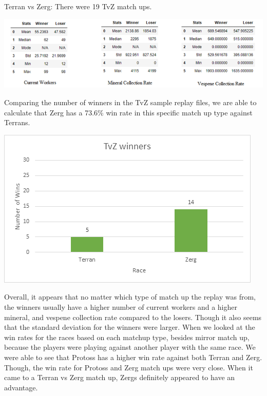 \documentclass[a4paper,12pt]{report}
\begin{document}
Terran vs Zerg:
There were 19 TvZ match ups.

\begin{center}
    \captionsetup{type=figure}
    \includegraphics[width=.9\linewidth]{media/WorkersCollectionTvZ.png}
\end{center}

Comparing the number of winners in the TvZ sample replay files, we are able to calculate that Zerg has a 73.6\% win rate in this specific match up type against Terrans.

\begin{center}
    \captionsetup{type=figure}
    \includegraphics[width=.9\linewidth]{media/TvZwinrate.png}
\end{center}

Overall, it appears that no matter which type of match up the replay was from, the winners usually have a higher number of current workers and a higher mineral, and vespene collection rate compared to the losers. Though it also seems that the standard deviation for the winners were larger. When we looked at the win rates for the races based on each matchup type, besides mirror match up, because the players were playing against another player with the same race. We were able to see that Protoss has a higher win rate against both Terran and Zerg. Though, the win rate for Protoss and Zerg match ups were very close. When it came to a Terran vs Zerg match up, Zergs definitely appeared to have an advantage. 
\end{document}
